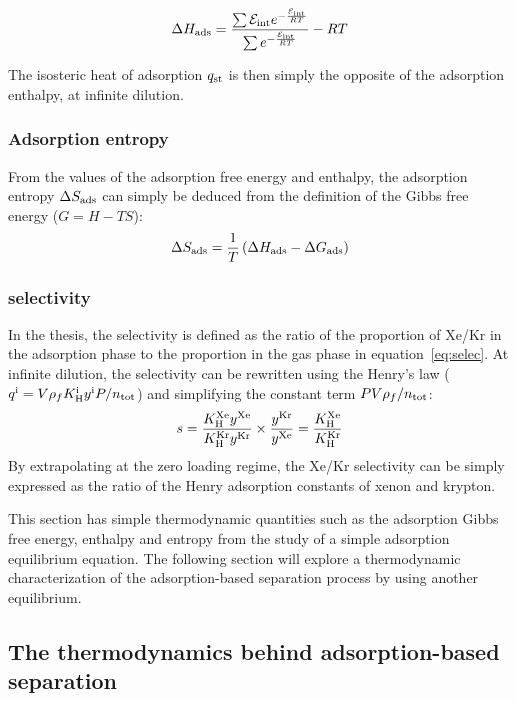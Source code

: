 \documentclass[main.tex]{subfiles}
\begin{document}
\begin{equation}\label{eq:ads_enthalpy}
  \Delta H_{\text{ads}} = \dfrac{\sum \mathcal{E}_{\text{int}}e^{-\frac{\mathcal{E}_{\text{int}}}{RT}}}{\sum e^{-\frac{\mathcal{E}_{\text{int}}}{RT}}} - RT
\end{equation}

The isosteric heat of adsorption $q_{\text{st}}$ is then simply the opposite of the adsorption enthalpy, at infinite dilution. 

\subsubsection{Adsorption entropy}

From the values of the adsorption free energy and enthalpy, the adsorption entropy $\Delta S_{\text{ads}}$ can simply be deduced from the definition of the Gibbs free energy ($G = H-TS$):
\begin{equation}\label{eq:ads_entropy}
  \Delta S_{\text{ads}} = \dfrac{1}{T} \left(\Delta H_{\text{ads}} - \Delta G_{\text{ads}} \right)
\end{equation}

\subsubsection{selectivity}

In the thesis, the selectivity is defined as the ratio of the proportion of Xe/Kr in the adsorption phase to the proportion in the gas phase in equation~\ref{eq:selec}. At infinite dilution, the selectivity can be rewritten using the Henry's law ($q^{\text{i}}=V\rho_f K_{\text{H}}^{\text{i}}y^{\text{i}}P/n_{\text{tot}}$) and simplifying the constant term $PV\rho_f/n_{\text{tot}}$:
\begin{equation}\label{eq:selec_0}
  s = \dfrac{K_{\text{H}}^{\text{Xe}}y^{\text{Xe}}}{K_{\text{H}}^{\text{Kr}}y^{\text{Kr}}}\times\dfrac{y^{\text{Kr}}}{y^{\text{Xe}}} = \dfrac{K_{\text{H}}^{\text{Xe}}}{K_{\text{H}}^{\text{Kr}}}
\end{equation}
By extrapolating at the zero loading regime, the Xe/Kr selectivity can be simply expressed as the ratio of the Henry adsorption constants of xenon and krypton.

This section has simple thermodynamic quantities such as the adsorption Gibbs free energy, enthalpy and entropy from the study of a simple adsorption equilibrium equation. The following section will explore a thermodynamic characterization of the adsorption-based separation process by using another equilibrium. 

\subsection{The thermodynamics behind adsorption-based separation}\label{sct:thermo}
\end{document}
